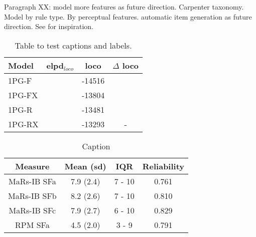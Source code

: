 \documentclass[a4paper,man,natbib]{apa6}
\begin{document}
Paragraph XX: model more features as future direction. Carpenter taxonomy. Model by rule type. By perceptual features. automatic item generation as future direction. See \cite{lathrop2017item} for inspiration.



\begin{table}
\centering
\begin{tabular}{l|c|c|c}
Model & elpd$_{loco}$ & loco & $\Delta$ loco \\\hline
1PG-F &  & -14516 & \\
1PG-FX &  & -13804 & \\
1PG-R &  & -13481 & \\
1PG-RX &  & -13293 & - \\
\end{tabular}
\caption{Table to test captions and labels.}
\label{table:1}
\end{table}

\begin{table}
    \centering
    \begin{tabular}{c|c|c|c}
    Measure & Mean (sd) & IQR & Reliability \\
    \hline
    MaRs-IB SFa & 7.9 (2.4) & 7 - 10 & 0.761 \\
    MaRs-IB SFb & 8.2 (2.6) & 7 - 10 & 0.810 \\
    MaRs-IB SFc & 7.9 (2.7) & 6 - 10 & 0.829 \\
    RPM SFa & 4.5 (2.0) & 3 - 9 & 0.791 \\
    \end{tabular}
    \caption{Caption}
    \label{table:2}
\end{table}
\end{document}
